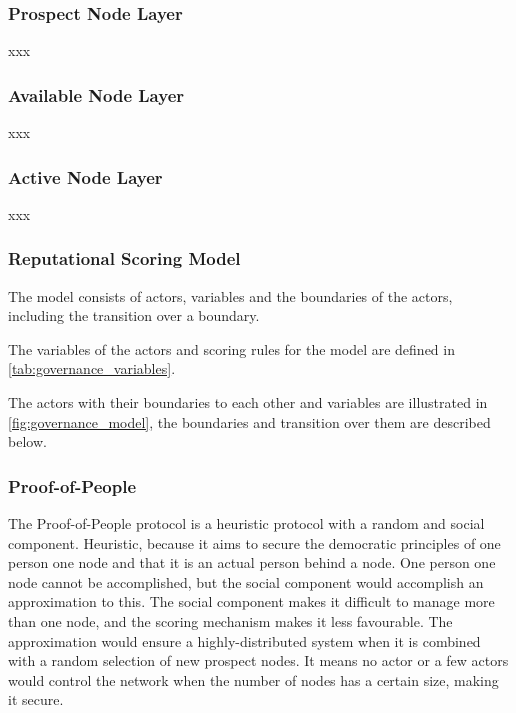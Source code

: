 \subsubsection{Prospect Node Layer} \label{sec:prostect_node_layer}
xxx

\subsubsection{Available Node Layer} \label{sec:available_node_layer}
xxx

\subsubsection{Active Node Layer} \label{sec:active_node_layer}
xxx


\subsubsection{Reputational Scoring Model} \label{sec:reputational_scoring_model}
The model consists of actors, variables and the boundaries of the actors, including the transition over a boundary.


The variables of the actors and scoring rules for the model are defined in \cref{tab:governance_variables}.


The actors with their boundaries to each other and variables are illustrated in \cref{fig:governance_model}, the boundaries and transition over them are described below.



\subsubsection{Proof-of-People} \label{sec:proof-of-people}
The Proof-of-People protocol is a heuristic protocol with a random and social component. Heuristic, because it aims to secure the democratic principles of one person one node and that it is an actual person behind a node. One person one node cannot be accomplished, but the social component would accomplish an approximation to this. The social component makes it difficult to manage more than one node, and the scoring mechanism makes it less favourable. The approximation would ensure a highly-distributed system when it is combined with a random selection of new prospect nodes. It means no actor or a few actors would control the network when the number of nodes has a certain size, making it secure.

